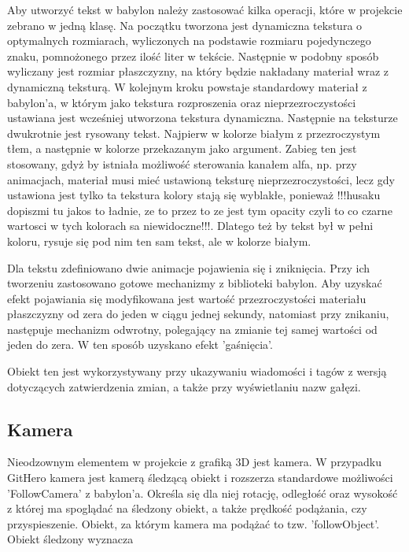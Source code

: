 \documentclass[11pt,a4paper,polish,thesis]{dcsbook}
\begin{document}
	Aby utworzyć tekst w babylon należy zastosować kilka operacji, które w projekcie zebrano w jedną klasę. Na początku tworzona jest dynamiczna tekstura o optymalnych rozmiarach, wyliczonych na podstawie rozmiaru pojedynczego znaku, pomnożonego przez ilość liter w tekście. Następnie w podobny sposób wyliczany jest rozmiar płaszczyzny, na który będzie nakładany materiał wraz z dynamiczną teksturą. W kolejnym kroku powstaje standardowy materiał z babylon'a, w którym jako tekstura rozproszenia oraz nieprzezroczystości ustawiana jest wcześniej utworzona tekstura dynamiczna. Następnie na teksturze dwukrotnie jest rysowany tekst. Najpierw w kolorze białym z przezroczystym tłem, a następnie w kolorze przekazanym jako argument. Zabieg ten jest stosowany, gdyż by istniała możliwość sterowania kanałem alfa, np. przy animacjach, materiał musi mieć ustawioną teksturę nieprzezroczystości, lecz gdy ustawiona jest tylko ta tekstura kolory stają się wyblakłe, ponieważ !!!husaku dopiszmi tu jakos to ładnie, ze to przez to ze jest tym opacity czyli to co czarne wartosci w tych kolorach sa niewidoczne!!!.
	Dlatego też by tekst był w pełni koloru, rysuje się pod nim ten sam tekst, ale w kolorze białym.
	
	Dla tekstu zdefiniowano dwie animacje pojawienia się i zniknięcia. Przy ich tworzeniu zastosowano gotowe mechanizmy z biblioteki babylon. Aby uzyskać efekt pojawiania się modyfikowana jest wartość przezroczystości materiału płaszczyzny od zera do jeden w ciągu jednej sekundy, natomiast przy znikaniu, następuje mechanizm odwrotny, polegający na zmianie tej samej wartości od jeden do zera. W ten sposób uzyskano efekt 'gaśnięcia'.
	
	Obiekt ten jest wykorzystywany przy ukazywaniu wiadomości i tagów z wersją dotyczących zatwierdzenia zmian, a także przy wyświetlaniu nazw gałęzi.

	

	\subsection{Kamera}
	
	Nieodzownym elementem w projekcie z grafiką 3D jest kamera. W przypadku GitHero kamera jest kamerą śledzącą obiekt i rozszerza standardowe możliwości 'FollowCamera' z babylon'a. Określa się dla niej rotację, odległość oraz wysokość z której ma spoglądać na śledzony obiekt, a także prędkość podążania, czy przyspieszenie. Obiekt, za którym kamera ma podążać to tzw. 'followObject'. Obiekt śledzony wyznacza %
	
\end{document}
